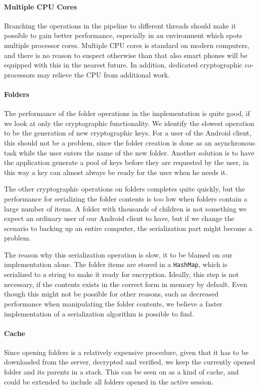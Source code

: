\documentclass[pdftex,english,10pt,b5paper,twoside]{book}
\begin{document}
\paragraph{Multiple CPU Cores} Branching the operations in the pipeline to
different threads should make it possible to gain better performance,
especially in an environment which spots multiple processor cores. Multiple
\ac{CPU} cores is standard on modern computers, and there is no reason to
suspect otherwise than that also smart phones will be equipped with this in the
nearest future. In addition, dedicated cryptographic co-processors may
relieve the \ac{CPU} from additional work.

\paragraph{Folders} The performance of the folder operations in the
implementation is quite good, if we look at only the cryptographic
functionality. We identify the slowest operation to be the generation of
new cryptographic keys. For a user of the Android client, this should not be a
problem, since the folder creation is done as an asynchronous task while the
user enters the name of the new folder. Another solution is to have the
application generate a pool of keys before they are requested by the user, in
this way a key can almost always be ready for the user when he needs it.

The other cryptographic operations on folders completes quite quickly, but the
performance for serializing the folder contents is too low when folders contain
a large number of items. A folder with thousands of children is not
something we expect an ordinary user of our Android client to have, but if we
change the scenario to backing up an entire computer, the serialization part
might become a problem. 

The reason why this serialization operation is slow, it to be blamed on our
implementation alone. The folder items are stored in a \texttt{HashMap}, which
is serialized to a string to make it ready for encryption. Ideally, this step
is not necessary, if the contents exists in the correct form in memory by
default. Even though this might not be possible for other reasons, such as
decreased performance when manipulating the folder contents, we believe a
faster implementation of a serialization algorithm is possible to find.

\paragraph{Cache} Since opening folders is a relatively expensive procedure,
given that it has to be downloaded from the server, decrypted and verified, we
keep the currently opened folder and its parents in a stack. This can be seen
on as a kind of cache, and could be extended to include all folders opened
in the active session.
\end{document}
